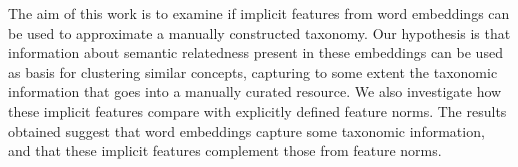 The aim of this work is to examine if implicit features from word embeddings can be used to approximate a manually constructed taxonomy. Our hypothesis is that information about semantic relatedness present in these embeddings can be used as basis for clustering similar concepts, capturing to some extent the taxonomic information that goes into a manually curated resource. We also investigate how these implicit features compare with explicitly defined feature norms. The results obtained suggest that word embeddings capture some taxonomic information, and that these implicit features complement those from feature norms.
